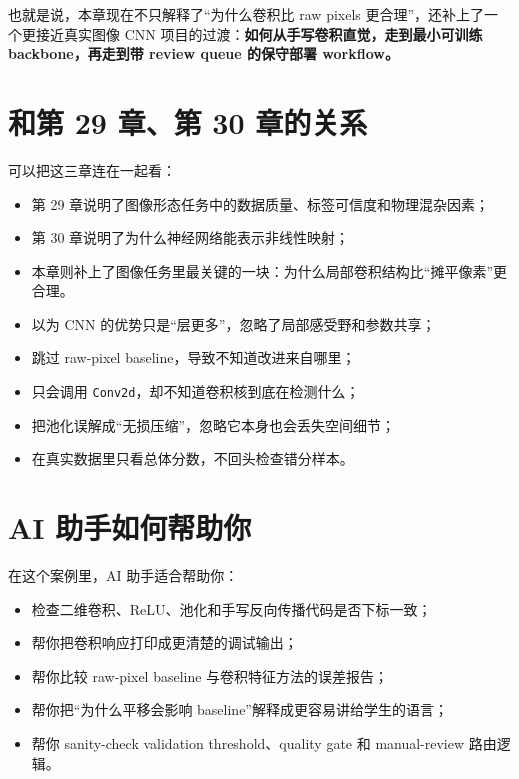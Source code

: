 也就是说，本章现在不只解释了“为什么卷积比 raw pixels 更合理”，还补上了一个更接近真实图像 CNN 项目的过渡：\textbf{如何从手写卷积直觉，走到最小可训练 backbone，再走到带 review queue 的保守部署 workflow。}

\section{和第 29 章、第 30 章的关系}

可以把这三章连在一起看：

\begin{itemize}
    \item 第 29 章说明了图像形态任务中的数据质量、标签可信度和物理混杂因素；
    \item 第 30 章说明了为什么神经网络能表示非线性映射；
    \item 本章则补上了图像任务里最关键的一块：为什么局部卷积结构比“摊平像素”更合理。
\end{itemize}

\begin{warnbox}[卷积入门中的常见误区]
\begin{itemize}
    \item 以为 CNN 的优势只是“层更多”，忽略了局部感受野和参数共享；
    \item 跳过 raw-pixel baseline，导致不知道改进来自哪里；
    \item 只会调用 \texttt{Conv2d}，却不知道卷积核到底在检测什么；
    \item 把池化误解成“无损压缩”，忽略它本身也会丢失空间细节；
    \item 在真实数据里只看总体分数，不回头检查错分样本。
\end{itemize}
\end{warnbox}

\section{AI 助手如何帮助你}

在这个案例里，AI 助手适合帮助你：

\begin{itemize}
    \item 检查二维卷积、ReLU、池化和手写反向传播代码是否下标一致；
    \item 帮你把卷积响应打印成更清楚的调试输出；
    \item 帮你比较 raw-pixel baseline 与卷积特征方法的误差报告；
    \item 帮你把“为什么平移会影响 baseline”解释成更容易讲给学生的语言；
    \item 帮你 sanity-check validation threshold、quality gate 和 manual-review 路由逻辑。
\end{itemize}

